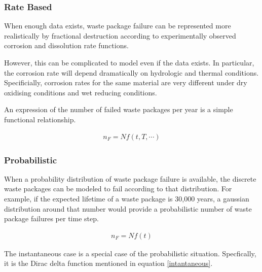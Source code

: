 \subsubsection{Rate Based} 

When enough data exists, waste package failure can
be represented more  realistically by fractional destruction according to
experimentally observed corrosion and dissolution rate functions.

However, this can be complicated to model even if the data exists. In
particular, the corrosion rate will depend dramatically on hydrologic and
thermal conditions. Specificially, corrosion rates for the same material are
very different under dry oxidising conditions and wet reducing conditions. 


An expression of the number of failed waste packages per year is a simple 
functional relationship. 

\begin{align}
  n_F = Nf(t,T,\cdots)
  \label{rate}
\end{align}

\subsubsection{Probabilistic}

When a probability distribution of waste package failure is available, the 
discrete waste packages can be modeled to fail according to that distribution. 
For example, if the expected lifetime of a waste package is 30,000 years, a 
gaussian distribution around that number would provide a probabilistic number of 
waste package failures per time step. 

\begin{align}
  n_F=Nf(t)
  \label{probabilistic}
\end{align}

The instantaneous case is a special case of the probabilistic situation. 
Specfically, it is the Dirac delta function mentioned in equation 
\eqref{intantaneous}.


